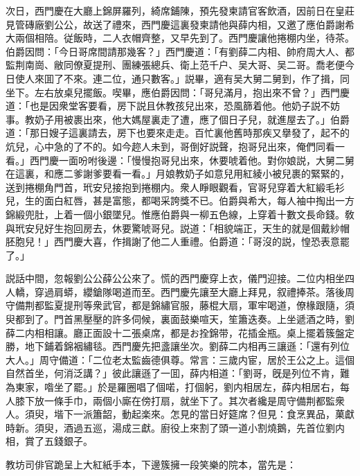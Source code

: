 次日，西門慶在大廳上錦屏羅列，綺席鋪陳，預先發柬請官客飲酒，因前日在皇莊見管磚廠劉公公，故送了禮來，西門慶這裏發柬請他與薛内相，又邀了應伯爵謝希大兩個相陪。従飯時，二人衣帽齊整，又早先到了。西門慶讓他捲棚内坐，待茶。伯爵因問：「今日哥席間請那幾客？」西門慶道：「有劉薛二内相、帥府周大人、都監荆南崗、敝同僚夏提刑、團練張總兵、衛上范千户、吴大哥、吴二哥。喬老便今日使人來囬了不來。連二位，通只數客。」説畢，適有吴大舅二舅到，作了揖，同坐下。左右放桌兒擺飯。喫畢，應伯爵因問：「哥兒滿月，抱出來不曾？」西門慶道：「也是因衆堂客要看，房下説且休教孩兒出來，恐風篩着他。他奶子説不妨事。教奶子用被裹出來，他大媽屋裏走了遭，應了個日子兒，就進屋去了。」伯爵道：「那日嫂子這裏請去，房下也要來走走。百忙裏他舊時那疾又擧發了，起不的炕兒，心中急的了不的。如今趂人未到，哥倒好説聲，抱哥兒出來，俺們同看一看。」西門慶一面吩咐後邊：「慢慢抱哥兒出來，休要唬着他。對你娘説，大舅二舅在這裏，和應二爹謝爹要看一看。」月娘教奶子如意兒用紅綾小被兒裹的緊緊的，送到捲棚角門首，玳安兒接抱到捲棚内。衆人睜眼觀看，官哥兒穿着大紅緞毛衫兒，生的面白紅唇，甚是富態，都喝采誇獎不已。伯爵與希大，每人袖中掏出一方錦緞兜肚，上着一個小銀墜兒。惟應伯爵與一柳五色線，上穿着十數文長命錢。敎與玳安兒好生抱回房去，休要驚唬哥兒。説道：「相貌端正，天生的就是個戴紗帽胚胞兒！」西門慶大喜，作揖謝了他二人重禮。伯爵道：「哥沒的説，惶恐表意罷了。」

説話中間，忽報劉公公薛公公來了。慌的西門慶穿上衣，儀門迎接。二位内相坐四人轎，穿過肩蟒，纓鎗隊喝道而至。西門慶先讓至大廳上拜見，叙禮捧茶。落後周守備荆都監夏提刑等衆武官，都是錦繡官服，藤棍大扇，軍牢喝道，僚椽跟隨，須臾都到了。門首黑壓壓的許多伺候，裏面鼓樂喧天，笙簫迭奏。上坐遞酒之時，劉薛二内相相讓。廳正面設十二張桌席，都是お拴錦带，花插金瓶。桌上擺着簇盤定勝，地下鋪着錦裀繡毯。西門慶先把盞讓坐次。劉薛二内相再三讓遜：「還有列位大人。」周守備道：「二位老太監齒德俱尊。常言：三歲内宦，居於王公之上。這個自然首坐，何消泛講？」彼此讓遜了一囬，薛内相道：「劉哥，旣是列位不肯，難為東家，喒坐了罷。」於是羅圈唱了個喏，打個躬，劉内相居左，薛内相居右，每人膝下放一條手巾，兩個小廝在傍打扇，就坐下了。其次者纔是周守備荆都監衆人。須臾，堦下一派簫韶，動起楽來。怎見的當日好筵席？但見：食烹異品，菓獻時新。須臾，酒過五巡，湯成三獻。廚役上來割了頭一道小割燒鵝，先首位劉内相，賞了五錢銀子。

教坊司俳官跪呈上大紅紙手本，下邊簇擁一段笑樂的院本，當先是：

